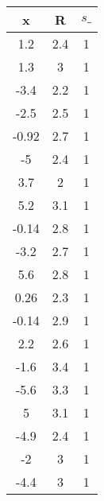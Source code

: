 \begin{tiny}\begin{tabular}{|c|c|c|}
\hline
\textbf{x}&\textbf{R}&\textbf{$s\_$}\\\hline
1.2&2.4&1\\\hline
1.3&3&1\\\hline
-3.4&2.2&1\\\hline
-2.5&2.5&1\\\hline
-0.92&2.7&1\\\hline
-5&2.4&1\\\hline
3.7&2&1\\\hline
5.2&3.1&1\\\hline
-0.14&2.8&1\\\hline
-3.2&2.7&1\\\hline
5.6&2.8&1\\\hline
0.26&2.3&1\\\hline
-0.14&2.9&1\\\hline
2.2&2.6&1\\\hline
-1.6&3.4&1\\\hline
-5.6&3.3&1\\\hline
5&3.1&1\\\hline
-4.9&2.4&1\\\hline
-2&3&1\\\hline
-4.4&3&1\\\hline
\end{tabular}
\end{tiny}